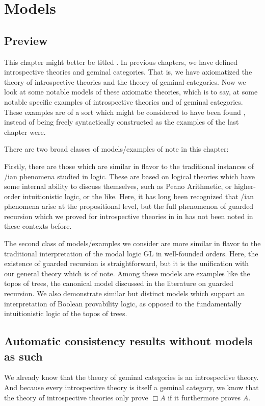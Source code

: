 \filestart

\section{Models}

\subsection{Preview}
This chapter might better be titled . In previous chapters, we have defined introspective theories and geminal categories. That is, we have axiomatized the theory of introspective theories and the theory of geminal categories. Now we look at some notable models of these axiomatic theories, which is to say, at some notable specific examples of introspective theories and of geminal categories. These examples are of a sort which might be considered to have been found , instead of being freely syntactically constructed as the examples of the last chapter were.

There are two broad classes of models/examples of note in this chapter:

Firstly, there are those which are similar in flavor to the traditional instances of \Goedel/ian phenomena studied in logic. These are based on logical theories which have some internal ability to discuss themselves, such as Peano Arithmetic, or higher-order intuitionistic logic, or the like. Here, it has long been recognized that \Goedel/ian phenomena arise at the propositional level, but the full phenomenon of guarded recursion which we proved for introspective theories in \TODO in has not been noted in these contexts before.

The second class of models/examples we consider are more similar in flavor to the traditional interpretation of the modal logic GL in well-founded orders. Here, the existence of guarded recursion is straightforward, but it is the unification with our general theory which is of note. Among these models are examples like the topos of trees, the canonical model discussed in the literature on guarded recursion. We also demonstrate similar but distinct models which support an interpretation of Boolean provability logic, as opposed to the fundamentally intuitionistic logic of the topos of trees.

\subsection{Automatic consistency results without models as such}
We already know that the theory of geminal categories is an introspective theory. And because every introspective theory is itself a geminal category, we know that the theory of introspective theories only prove $\Box A$ if it furthermore proves $A$.

